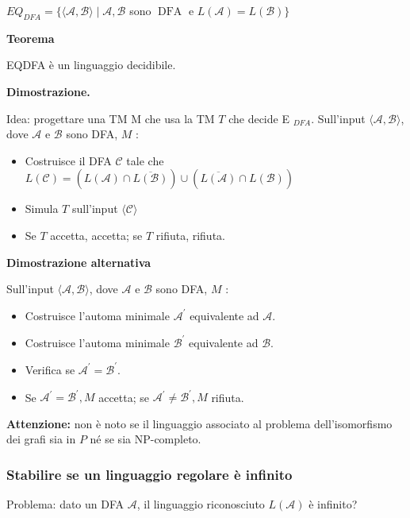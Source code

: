 $E Q_{D F A}=\{\langle\mathcal{A}, \mathcal{B}\rangle \mid \mathcal{A}, \mathcal{B}$ sono $\operatorname{DFA}$ e $L(\mathcal{A})=L(\mathcal{B})\}$

\vspace{5mm}

\textbf{Teorema}

EQDFA è un linguaggio decidibile.

\vspace{5mm}

\textbf{Dimostrazione.}


Idea: progettare una TM M che usa la TM $T$ che decide E $_{D F A}$.
Sull'input $\langle\mathcal{A}, \mathcal{B}\rangle$, dove $\mathcal{A}$ e $\mathcal{B}$ sono DFA, $M$ :
\begin{itemize}
    \item Costruisce il DFA $\mathcal{C}$ tale che $L(\mathcal{C})=(L(\mathcal{A}) \cap \overline{L(\mathcal{B})}) \cup(\overline{L(\mathcal{A})} \cap L(\mathcal{B}))$
    \item Simula $T$ sull'input $\langle\mathcal{C}\rangle$
    \item Se $T$ accetta, accetta; se $T$ rifiuta, rifiuta.
\end{itemize}
\textbf{Dimostrazione alternativa}

Sull'input $\langle\mathcal{A}, \mathcal{B}\rangle$, dove $\mathcal{A}$ e $\mathcal{B}$ sono DFA, $M$ :
\begin{itemize}
    \item Costruisce l'automa minimale $\mathcal{A}^{\prime}$ equivalente ad $\mathcal{A}$.
    \item Costruisce l'automa minimale $\mathcal{B}^{\prime}$ equivalente ad $\mathcal{B}$.
    \item Verifica se $\mathcal{A}^{\prime}=\mathcal{B}^{\prime}$.
    \item Se $\mathcal{A}^{\prime}=\mathcal{B}^{\prime}, M$ accetta; se $\mathcal{A}^{\prime} \neq \mathcal{B}^{\prime}, M$ rifiuta.
\end{itemize}

\textbf{Attenzione:} non è noto se il linguaggio associato al problema dell'isomorfismo dei grafi sia in $P$ né se sia NP-completo.

\subsubsection{Stabilire se un linguaggio regolare è infinito}

Problema: dato un DFA $\mathcal{A}$, il linguaggio riconosciuto $L(\mathcal{A})$ è infinito?


